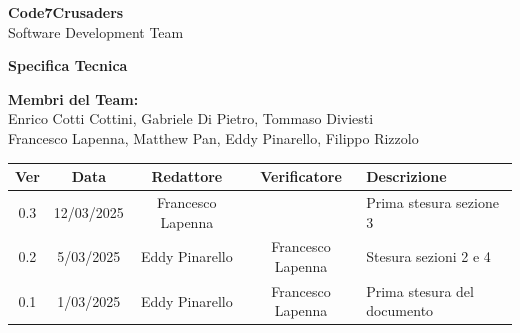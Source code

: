 \documentclass{article}
\begin{document}
\begin{titlepage}
    {\Huge \textbf{Code7Crusaders}}\\
    \vspace{0.5cm}
    {\Large Software Development Team}\\
    \vspace{2cm}
    
    \large \textbf{Specifica Tecnica}
    \vspace{3.9cm}

    \textbf{Membri del Team:}\\
    Enrico Cotti Cottini, Gabriele Di Pietro, Tommaso Diviesti \\
    Francesco Lapenna, Matthew Pan, Eddy Pinarello, Filippo Rizzolo \\
    \vspace{0.5cm}
    
    \vspace{1cm}
\end{titlepage}



\newpage
\begin{table}[h]
    \centering
    \renewcommand{\arraystretch}{1.2}
    \setlength{\tabcolsep}{5pt}
    \begin{tabular}{|c|c|c|c|m{}|}
        \hline
        \textbf{Ver} & \textbf{Data} & \textbf{Redattore} & \textbf{Verificatore} & \textbf{Descrizione} \\
        \hline
        0.3 & 12/03/2025 & Francesco Lapenna &  & Prima stesura sezione 3 \\
        \hline
        0.2 & 5/03/2025 & Eddy Pinarello & Francesco Lapenna & Stesura sezioni 2 e 4 \\
        \hline
        0.1 & 1/03/2025 & Eddy Pinarello & Francesco Lapenna & Prima stesura del documento \\
        \hline
    \end{tabular}
\end{table}


\newpage
\tableofcontents
\listoftables
\listoffigures

\newpage



\newpage



\newpage



\newpage


\end{document}
